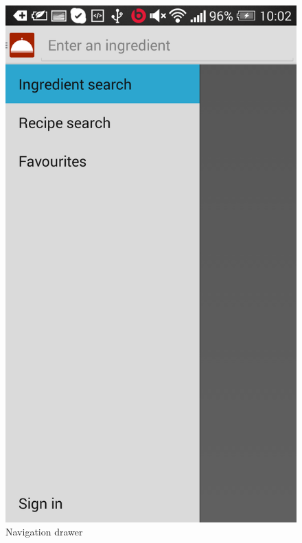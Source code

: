\begin{figure}[H]
\begin{minipage}[t]{0.5\columnwidth}
\centering
\includegraphics[width=0.7\columnwidth]{img/screenshots/finaldrawer.png}
\caption{Navigation drawer\label{fig:navdrawer1}}
\end{minipage}
\hspace{0.5cm}
\begin{minipage}[t]{0.5\columnwidth}
\centering

\end{minipage}
\end{figure}
